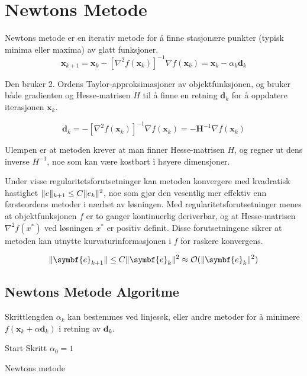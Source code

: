 \section{Newtons Metode}
\label{sec:newtons_method}
Newtons metode er en iterativ metode for å finne stasjonære punkter (typisk minima eller maxima) av glatt funksjoner.
\[
	\mathbf{x}_{k+1} = \mathbf{x}_k - [\nabla^2 f(\mathbf{x}_k)]^{-1} \nabla f(\mathbf{x}_k) = \mathbf{x}_k - \alpha_k \mathbf{d}_k
\]\label{eq:newtons_method}

Den bruker 2. Ordens Taylor-approksimasjoner av objektfunksjonen, og bruker både gradienten og Hesse-matrisen $H$ til å finne en retning $\symbf{d}_k$ for å oppdatere iterasjonen $\symbf{x}_k$.

\[
	\symbf{d}_k = -[\nabla^2 f(\symbf{x}_k)]^{-1} \nabla f(\symbf{x}_k) = -\symbf{H}^{-1} \nabla f(\symbf{x}_k)
\]

Ulempen er at metoden krever at man finner Hesse-matrisen $H$, og regner ut dens inverse $H^{-1}$, noe som kan være kostbart i høyere dimensjoner.

Under visse regularitetsforutsetninger kan metoden konvergere med kvadratisk hastighet $\lVert e\rVert_{k+1} \leq C \lVert e_k\rVert^2$, noe som gjør den vesentlig mer effektiv enn førsteordens metoder i nærhet av løsningen.
Med regularitetsforutsetninger menes at objektfunksjonen $f$ er to ganger kontinuerlig deriverbar, og at Hesse-matrisen $\nabla^2 f(x^\ast)$ ved løsningen $x^\ast$ er positiv definit.
Disse forutsetningene sikrer at metoden kan utnytte kurvaturinformasjonen i $f$ for raskere konvergens.

\[
	\norm{\symbf{e}_{k+1}} \leq C \norm{\symbf{e}_k}^2 \approx \mathcal{O}(\norm{\symbf{e}_k}^2)
\]

\subsection{Newtons Metode Algoritme}
Skrittlengden \(\alpha_k\) kan bestemmes ved linjesøk, eller andre metoder for å minimere \(f(\symbf{x}_k + \alpha \symbf{d}_k)\) i retning av \(\symbf{d}_k\).

\begin{algorithm}[H]
	\SetAlgoLined
	Start Skritt \(\alpha_0 = 1\)\;
	\caption{Newtons metode}
\end{algorithm}

